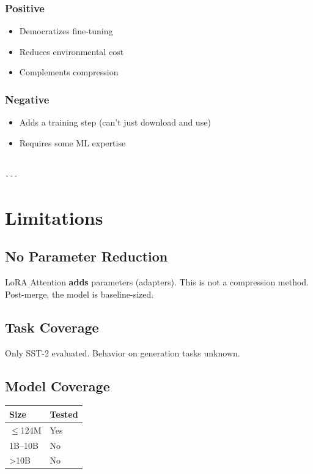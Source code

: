 \subsubsection{Positive}
\begin{itemize}
\item Democratizes fine-tuning
\item Reduces environmental cost
\item Complements compression

\end{itemize}
\subsubsection{Negative}
\begin{itemize}
\item Adds a training step (can't just download and use)
\item Requires some ML expertise
\end{itemize}
\begin{lstlisting}

---
\end{lstlisting}

\section{Limitations}

\subsection{No Parameter Reduction}

LoRA Attention \textbf{adds} parameters (adapters). This is not a compression 
method. Post-merge, the model is baseline-sized.

\subsection{Task Coverage}

Only SST-2 evaluated. Behavior on generation tasks unknown.

\subsection{Model Coverage}

\begin{table}[H]
\centering
\small
\begin{tabular}{ll}
\toprule
\textbf{Size} & \textbf{Tested} \\
\midrule
$\le$124M & Yes \\
1B--10B & No \\
>10B & No \\
\bottomrule
\end{tabular}
\end{table}


